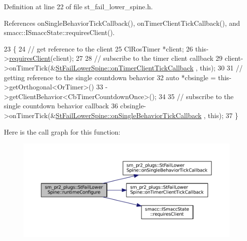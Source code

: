 Definition at line 22 of file st\+\_\+fail\+\_\+lower\+\_\+spine.\+h.



References on\+Single\+Behavior\+Tick\+Callback(), on\+Timer\+Client\+Tick\+Callback(), and smacc\+::\+I\+Smacc\+State\+::requires\+Client().


\begin{DoxyCode}
23     \{
24         \textcolor{comment}{// get reference to the client}
25         ClRosTimer *client;
26         this->\hyperlink{classsmacc_1_1ISmaccState_a7f95c9f0a6ea2d6f18d1aec0519de4ac}{requiresClient}(client);
27 
28         \textcolor{comment}{// subscribe to the timer client callback}
29         client->onTimerTick(&\hyperlink{structsm__pr2__plugs_1_1StFailLowerSpine_add90ff06e4fa2743017927b67e274c95}{StFailLowerSpine::onTimerClientTickCallback}
      , \textcolor{keyword}{this});
30 
31         \textcolor{comment}{// getting reference to the single countdown behavior}
32         \textcolor{keyword}{auto} *cbsingle = this->getOrthogonal<OrTimer>()
33                              ->getClientBehavior<CbTimerCountdownOnce>();
34 
35         \textcolor{comment}{// subscribe to the single countdown behavior callback}
36         cbsingle->onTimerTick(&\hyperlink{structsm__pr2__plugs_1_1StFailLowerSpine_aff67cab227312476a56bb92261d88e3b}{StFailLowerSpine::onSingleBehaviorTickCallback}
      , \textcolor{keyword}{this});
37     \}
\end{DoxyCode}
Here is the call graph for this function\+:
\nopagebreak
\begin{figure}[H]
\begin{center}
\leavevmode
\includegraphics[width=350pt]{structsm__pr2__plugs_1_1StFailLowerSpine_af368b88521b53cb5b46dc68a2dffa036_cgraph}
\end{center}
\end{figure}
\mbox{\label{structsm__pr2__plugs_1_1StFailLowerSpine_a11a49e55ac8e400fa3587ac15ecfb2a8}} 
